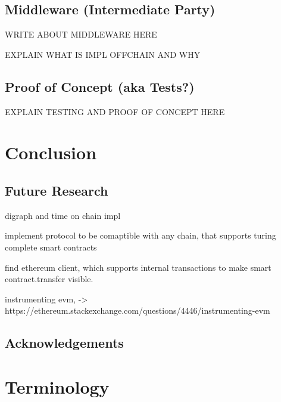 \section{Middleware (Intermediate Party)}
\label{sec:chapter04:middleware}
WRITE ABOUT MIDDLEWARE HERE

EXPLAIN WHAT IS IMPL OFFCHAIN AND WHY

\section{Proof of Concept (aka Tests?)}
\label{sec:chapter04:poc}
EXPLAIN TESTING AND PROOF OF CONCEPT HERE

\chapter{Conclusion}
\label{ch:chapter05}

\section{Future Research}
\label{sec:background:futureresearch}

digraph and time on chain impl

implement protocol to be comaptible with any chain, that supports turing complete smart contracts

find ethereum client, which supports internal transactions to make smart contract.transfer visible.

instrumenting evm, -> https://ethereum.stackexchange.com/questions/4446/instrumenting-evm

\section{Acknowledgements}
\label{sec:background:acknowledgements}


\chapter{Terminology}
\label{ch:chapter06}

